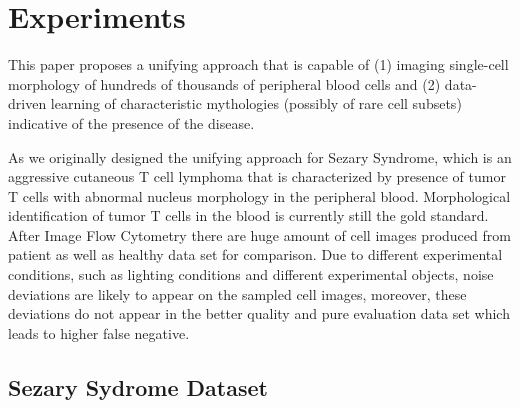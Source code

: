 































\chapter{Experiments}
\label{sec:examples}
This paper proposes a unifying approach that is capable of (1) imaging single-cell morphology of hundreds of thousands of peripheral blood cells and (2) data-driven learning of characteristic mythologies (possibly of rare cell subsets) indicative of the presence of the disease.

As we originally designed the unifying approach for Sezary Syndrome, which is an aggressive cutaneous T cell lymphoma that is characterized by presence of tumor T cells with abnormal nucleus morphology in the peripheral blood. Morphological identification of tumor T cells in the blood is currently still the gold standard.
After Image Flow Cytometry there are huge amount of cell images produced from patient as well as healthy data set for comparison. Due to different experimental conditions, such as lighting conditions and different experimental objects, noise deviations are likely to appear on the sampled cell images, moreover, these deviations do not appear in the better quality and pure evaluation data set which leads to higher false negative.



\section{Sezary Sydrome Dataset}
\label{sec:lorem}

